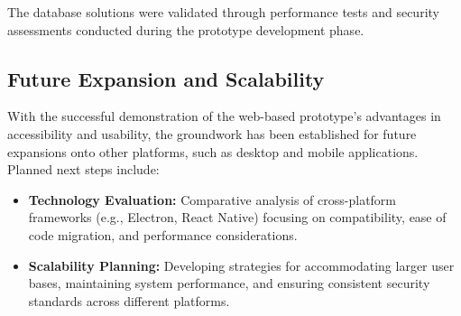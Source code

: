 The database solutions were validated through performance tests and security assessments conducted during the prototype development phase.


\subsection{Future Expansion and Scalability}
With the successful demonstration of the web-based prototype’s advantages in accessibility and usability, the groundwork has been established for future expansions onto other platforms, such as desktop and mobile applications. Planned next steps include:
\begin{itemize}
\item \textbf{Technology Evaluation:} Comparative analysis of cross-platform frameworks (e.g., Electron, React Native) focusing on compatibility, ease of code migration, and performance considerations.
\item \textbf{Scalability Planning:} Developing strategies for accommodating larger user bases, maintaining system performance, and ensuring consistent security standards across different platforms.
\end{itemize}



